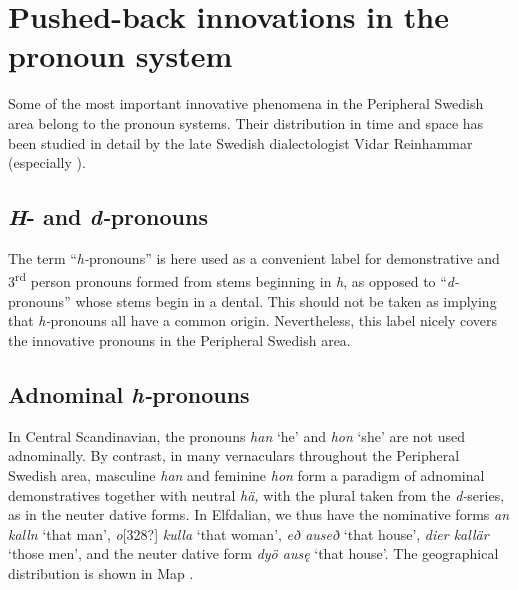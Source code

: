 \section{\rmfamily\bfseries Pushed-back innovations in the pronoun system}

\begin{styleBodyTextFirst}
Some of the most important innovative phenomena in the Peripheral Swedish area belong to the pronoun systems. Their distribution in time and space has been studied in detail by the late Swedish dialectologist Vidar Reinhammar (especially \citet{Reinhammar1975}). 

\end{styleBodyTextFirst}

\subsection{\textit{H}{}- and \textit{d-}pronouns}

\begin{styleBodyTextFirst}
The term “\textit{h-}pronouns” is here used as a convenient label for demonstrative and 3\textsuperscript{rd} person pronouns formed from stems beginning in \textit{h}, as opposed to “\textit{d-}pronouns” whose stems begin in a dental. This should not be taken as implying that \textit{h-}pronouns all have a common origin. Nevertheless, this label nicely covers the innovative pronouns in the Peripheral Swedish area.

\end{styleBodyTextFirst}

\subsection{Adnominal \textit{h-}pronouns}

\begin{styleBodyTextFirst}
In Central Scandinavian, the pronouns \textit{han} ‘he’ and \textit{hon} ‘she’ are not used adnominally. By contrast, in many vernaculars throughout the Peripheral Swedish area, masculine \textit{han} and feminine \textit{hon} form a paradigm of adnominal demonstratives together with neutral \textit{hä, }with the plural taken from the \textit{d-}series, as in the neuter dative forms\textit{. }In Elfdalian, we thus have the nominative forms \textit{an kalln} ‘that man’, \textit{o}[328?]\textit{ kulla} ‘that woman’, \textit{eð auseð} ‘that house’, \textit{dier kallär} ‘those men’, and the neuter dative form \textit{dyö ausę }‘that house’. The geographical distribution is shown in Map . 

\end{styleBodyTextFirst}

